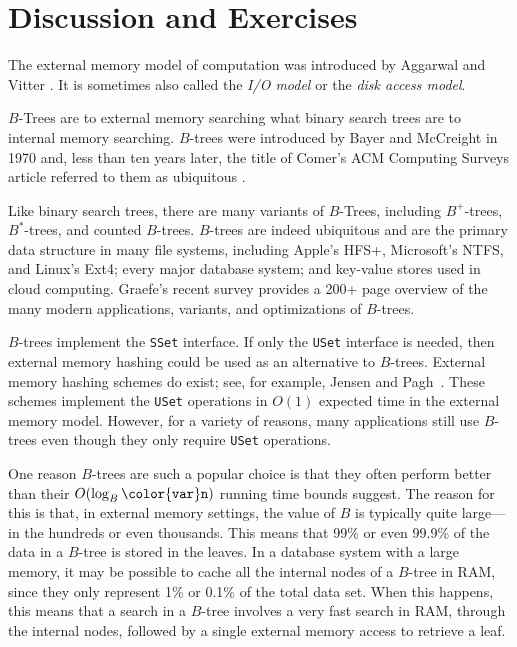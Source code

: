 \documentclass[10pt]{book}
\theoremstyle{plain}
\theoremstyle{definition}
\begin{document}
\section{Discussion and Exercises}

The external memory model of computation was introduced by Aggarwal and
Vitter \cite{av88}.  It is sometimes also called the \emph{I/O model}
%
or the \emph{disk access model}. 
%

$B$-Trees are to external memory searching what binary search trees
are to internal memory searching.  $B$-trees were introduced by Bayer
and McCreight \cite{bm70} in 1970 and, less than ten years later, the
title of Comer's ACM Computing Surveys article referred to
them as ubiquitous \cite{c79}.

Like binary search trees, there are many variants of $B$-Trees, including
$B^+$-trees,
%
$B^*$-trees,
%
and counted $B$-trees.
%
$B$-trees are indeed
ubiquitous and are the primary data structure in many file systems,
including Apple's HFS+,
%
Microsoft's NTFS, 
%
and Linux's Ext4;
%
every
major database system; and key-value stores used in cloud computing.
Graefe's recent survey \cite{g10} provides a 200+ page overview of the
many modern applications, variants, and optimizations of $B$-trees.

$B$-trees implement the \texttt{SSet} interface.  If only the \texttt{USet} interface
is needed, then external memory hashing
%
could be used as an alternative
to $B$-trees.  External memory hashing schemes do exist; see, for example,
Jensen and Pagh~\cite{jp08}.  These schemes implement the \texttt{USet} operations
in $O(1)$ expected time in the external memory model. However, for a
variety of reasons, many applications still use $B$-trees even though
they only require \texttt{USet} operations.

One reason $B$-trees are such a popular choice is that they often perform
better than their $O(\log_B \ensuremath{\mathtt{{\color{var}n}}})$ running time bounds suggest. The
reason for this is that, in external memory settings, the value of $B$
is typically quite large---in the hundreds or even thousands.  This means
that 99\% or even 99.9\% of the data in a $B$-tree is stored in the
leaves.  In a database system with a large memory, it may be possible
to cache all the internal nodes of a $B$-tree in RAM, since they only
represent 1\% or 0.1\% of the total data set.  When this happens,
this means that a search in a $B$-tree involves a very fast search in
RAM, through the internal nodes, followed by a single external memory
access to retrieve a leaf.
\end{document}
